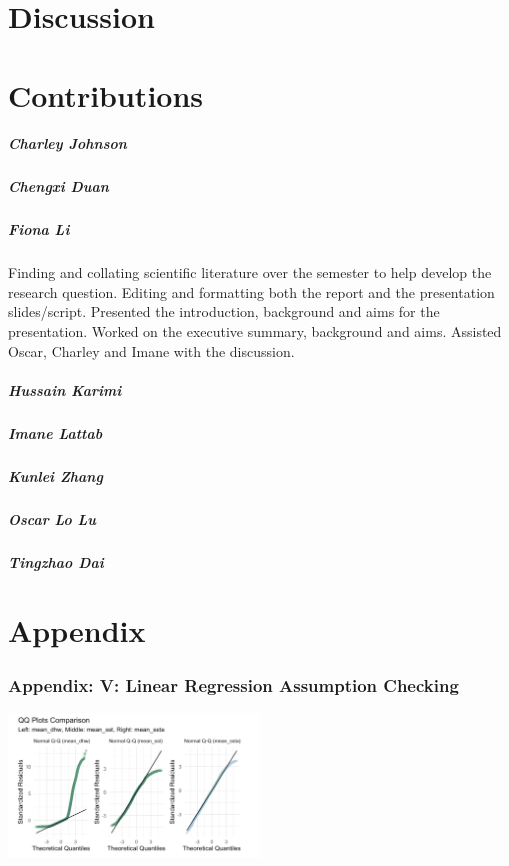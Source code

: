 \documentclass[letterpaper,9pt,twocolumn,twoside,]{pinp}
\begin{document}
\section{Discussion}\label{discussion}

\section{Contributions}\label{contributions}

\subparagraph{Charley Johnson}\label{charley-johnson}

\subparagraph{Chengxi Duan}\label{chengxi-duan}

\subparagraph{Fiona Li}\label{fiona-li}

Finding and collating scientific literature over the semester to help
develop the research question. Editing and formatting both the report
and the presentation slides/script. Presented the introduction,
background and aims for the presentation. Worked on the executive
summary, background and aims. Assisted Oscar, Charley and Imane with the
discussion.

\subparagraph{Hussain Karimi}\label{hussain-karimi}

\subparagraph{Imane Lattab}\label{imane-lattab}

\subparagraph{Kunlei Zhang}\label{kunlei-zhang}

\subparagraph{Oscar Lo Lu}\label{oscar-lo-lu}

\subparagraph{Tingzhao Dai}\label{tingzhao-dai}

\newpage

\section{Appendix}\label{appendix}

\subsubsection{Appendix: V: Linear Regression Assumption
Checking}\label{appendix-v-linear-regression-assumption-checking}

\begin{center}
\includegraphics[width=0.5\textwidth]{report_images/lr_qqplots.png}
\end{center}
\end{document}
